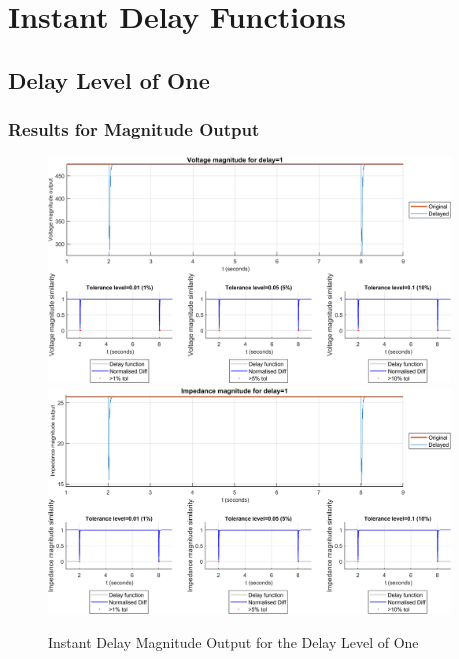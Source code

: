 \section{Instant Delay Functions}
\newpage \subsection{Delay Level of One}
\subsubsection{Results for Magnitude Output}
\begin{figure}[bp]
    \caption{Instant Delay Magnitude Output for the Delay Level of One}
    \includegraphics[width=0.95\textwidth]{PMUsim-figures/DelayOf_1/Instant_vMagnitude.png}    
      \includegraphics[width=0.95\textwidth]{PMUsim-figures/DelayOf_1/Instant_iMagnitude.png}      
    \label{fig:PMUsim_One_Magnitude}
\end{figure}

